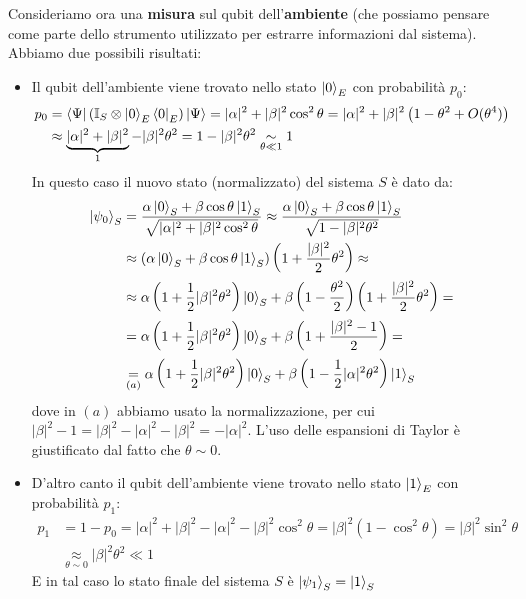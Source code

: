 \documentclass[../../InformazioneQuantistica.tex]{subfiles}
\begin{document}
Consideriamo ora una \textbf{misura} sul qubit dell'\textbf{ambiente} (che possiamo pensare come parte dello strumento utilizzato per estrarre informazioni dal sistema). Abbiamo due possibili risultati:
\begin{itemize}
\item Il qubit dell'ambiente viene trovato nello stato $\Ket{0}_E$ con probabilità $p_0$:
\begin{align*}
p_0 &= \Bra{\Psi}\left(\mathbb{I}_S \otimes \Ket{0}_E \Bra{0}_E \right)\Ket{\Psi} = |\alpha|^2 + |\beta|^2 \cos^2\theta = |\alpha|^2 + |\beta|^2 \left( 1-\theta^2 + O(\theta^4)\right) \\
&\approx \underbrace{|\alpha|^2 + |\beta|^2}_{1} - |\beta|^2 \theta^2 = 1-|\beta|^2 \theta^2 \underset{\theta \ll 1}{\sim} 1
\end{align*}
In questo caso il nuovo stato (normalizzato) del sistema $S$ è dato da:
\begin{align*}
\Ket{\psi_0}_S &= \frac{\alpha \Ket{0}_S + \beta \cos\theta \Ket{1}_S}{\sqrt{|\alpha|^2+|\beta|^2 \cos^2\theta}} \approx \frac{\alpha \Ket{0}_S + \beta \cos\theta \Ket{1}_S}{\sqrt{1-|\beta|^2\theta^2 }} \\
&\approx \left(\alpha \Ket{0}_S+\beta \cos\theta \Ket{1}_S\right)\left( 1+ \frac{|\beta|^2}{2}\theta^2\right) \approx\\
&\approx \alpha \left(1+\frac{1}{2}|\beta|^2 \theta^2\right) \Ket{0}_S +\beta \left(1-\frac{\theta^2}{2}\right)\left(1+\frac{|\beta|^2}{2}\theta^2\right) = \\
&=   \alpha \left(1+\frac{1}{2}|\beta|^2 \theta^2\right) \Ket{0}_S + \beta \left(1 + \frac{{|\beta|^2-1}}{2} \right) =\\
&\underset{(a)}{=} \alpha \left(1+\frac{1}{2}|\beta|^2 \theta^2\right)\Ket{0}_S +\beta \left(1-\frac{1}{2}|\alpha|^2 \theta^2\right) \Ket{1}_S
\end{align*}
dove in $(a)$ abbiamo usato la normalizzazione, per cui $|\beta|^2-1=|\beta|^2-|\alpha|^2-|\beta|^2=-|\alpha|^2$. L'uso delle espansioni di Taylor è giustificato dal fatto che $\theta \sim 0$.

\item D'altro canto il qubit dell'ambiente viene trovato nello stato $\Ket{1}_E$ con probabilità $p_1$:
\begin{align*}
p_1 &= 1-p_0 = |\alpha|^2 + |\beta|^2 - |\alpha|^2 -|\beta|^2\cos^2\theta =|\beta|^2(1-\cos^2\theta)=|\beta|^2 \sin^2\theta \\
&\underset{\theta \sim 0}{\approx} |\beta|^2 \theta^2 \ll 1
\end{align*}
E in tal caso lo stato finale del sistema $S$ è $\Ket{\psi_1}_S=\Ket{1}_S$
\end{itemize}
\end{document}

